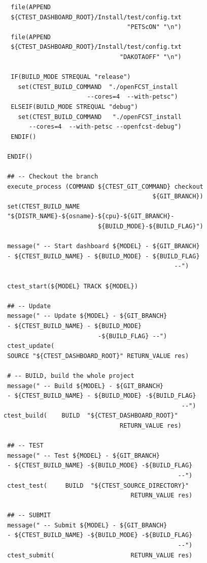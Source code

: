\begin{lstlisting}
        file(APPEND
        ${CTEST_DASHBOARD_ROOT}/Install/test/config.txt
                                        "PETScON" "\n")
        file(APPEND
        ${CTEST_DASHBOARD_ROOT}/Install/test/config.txt
                                      "DAKOTAOFF" "\n")

        IF(BUILD_MODE STREQUAL "release")
          set(CTEST_BUILD_COMMAND  "./openFCST_install
                             --cores=4  --with-petsc")
        ELSEIF(BUILD_MODE STREQUAL "debug")
          set(CTEST_BUILD_COMMAND   "./openFCST_install
             --cores=4  --with-petsc --openfcst-debug")
        ENDIF()

       ENDIF()

       ## -- Checkout the branch
       execute_process (COMMAND ${CTEST_GIT_COMMAND} checkout
                                               ${GIT_BRANCH})
       set(CTEST_BUILD_NAME
       "${DISTR_NAME}-${osname}-${cpu}-${GIT_BRANCH}-
                                ${BUILD_MODE}-${BUILD_FLAG}")

       message(" -- Start dashboard ${MODEL} - ${GIT_BRANCH}
       - ${CTEST_BUILD_NAME} - ${BUILD_MODE} - ${BUILD_FLAG}
                                                     --")
                                                       
       ctest_start(${MODEL} TRACK ${MODEL})

       ## -- Update
       message(" -- Update ${MODEL} - ${GIT_BRANCH}
       - ${CTEST_BUILD_NAME} - ${BUILD_MODE}
                                -${BUILD_FLAG} --")
       ctest_update(
       SOURCE "${CTEST_DASHBOARD_ROOT}" RETURN_VALUE res)

       # -- BUILD, build the whole project
       message(" -- Build ${MODEL} - ${GIT_BRANCH}
       - ${CTEST_BUILD_NAME} - ${BUILD_MODE} -${BUILD_FLAG}
                                                       --")
      ctest_build(    BUILD  "${CTEST_DASHBOARD_ROOT}"
                                      RETURN_VALUE res)
 
       ## -- TEST
       message(" -- Test ${MODEL} - ${GIT_BRANCH}
       - ${CTEST_BUILD_NAME} -${BUILD_MODE} -${BUILD_FLAG}
                                                      --")
       ctest_test(     BUILD  "${CTEST_SOURCE_DIRECTORY}"
                                         RETURN_VALUE res)

       ## -- SUBMIT
       message(" -- Submit ${MODEL} - ${GIT_BRANCH}
       - ${CTEST_BUILD_NAME} -${BUILD_MODE} -${BUILD_FLAG}
                                                      --")
       ctest_submit(                     RETURN_VALUE res)


\end{lstlisting}
